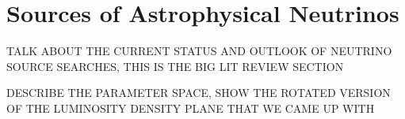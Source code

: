 \chapter{Sources of Astrophysical Neutrinos}
\label{sec:sources_overview}

TALK ABOUT THE CURRENT STATUS AND OUTLOOK OF NEUTRINO SOURCE SEARCHES, THIS IS THE BIG LIT REVIEW SECTION

DESCRIBE THE PARAMETER SPACE, SHOW THE ROTATED VERSION OF THE LUMINOSITY DENSITY PLANE THAT WE CAME UP WITH